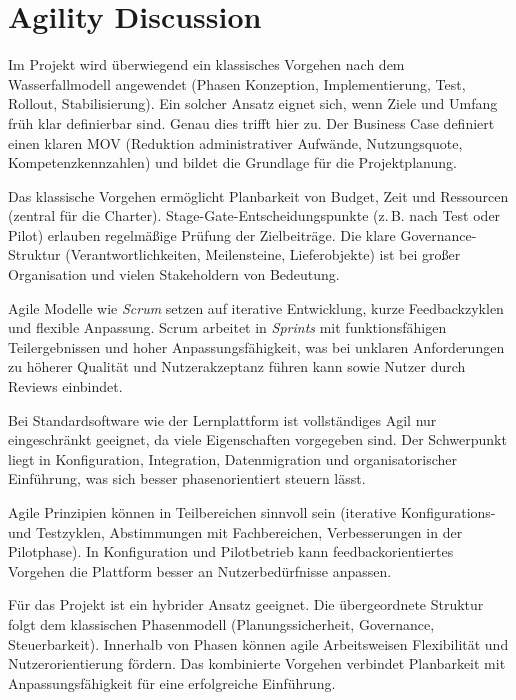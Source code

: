 \chapter{Agility Discussion}

Im Projekt wird überwiegend ein klassisches Vorgehen nach dem Wasserfallmodell angewendet (Phasen Konzeption, Implementierung, Test, Rollout, Stabilisierung). Ein solcher Ansatz eignet sich, wenn Ziele und Umfang früh klar definierbar sind. Genau dies trifft hier zu. Der Business Case definiert einen klaren \ac{MOV} (Reduktion administrativer Aufwände, Nutzungsquote, Kompetenzkennzahlen) und bildet die Grundlage für die Projektplanung.

Das klassische Vorgehen ermöglicht Planbarkeit von Budget, Zeit und Ressourcen (zentral für die Charter). Stage-Gate-Entscheidungspunkte (z.\,B. nach Test oder Pilot) erlauben regelmäßige Prüfung der Zielbeiträge. Die klare Governance-Struktur (Verantwortlichkeiten, Meilensteine, Lieferobjekte) ist bei großer Organisation und vielen Stakeholdern von Bedeutung.

Agile Modelle wie \textit{Scrum} setzen auf iterative Entwicklung, kurze Feedbackzyklen und flexible Anpassung. Scrum arbeitet in \textit{Sprints} mit funktionsfähigen Teilergebnissen und hoher Anpassungsfähigkeit, was bei unklaren Anforderungen zu höherer Qualität und Nutzerakzeptanz führen kann sowie Nutzer durch Reviews einbindet.

Bei Standardsoftware wie der Lernplattform ist vollständiges Agil nur eingeschränkt geeignet, da viele Eigenschaften vorgegeben sind. Der Schwerpunkt liegt in Konfiguration, Integration, Datenmigration und organisatorischer Einführung, was sich besser phasenorientiert steuern lässt.

Agile Prinzipien können in Teilbereichen sinnvoll sein (iterative Konfigurations- und Testzyklen, Abstimmungen mit Fachbereichen, Verbesserungen in der Pilotphase). In Konfiguration und Pilotbetrieb kann feedbackorientiertes Vorgehen die Plattform besser an Nutzerbedürfnisse anpassen.

Für das Projekt ist ein hybrider Ansatz geeignet. Die übergeordnete Struktur folgt dem klassischen Phasenmodell (Planungssicherheit, Governance, Steuerbarkeit). Innerhalb von Phasen können agile Arbeitsweisen Flexibilität und Nutzerorientierung fördern. Das kombinierte Vorgehen verbindet Planbarkeit mit Anpassungsfähigkeit für eine erfolgreiche Einführung.